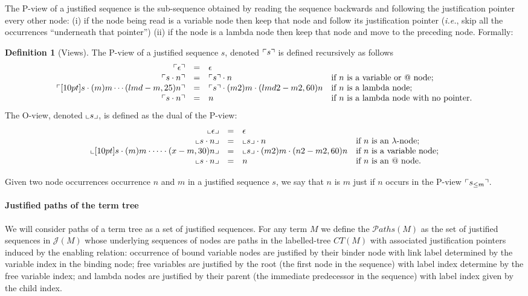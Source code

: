 \documentclass{article}
\makeatletter
\theoremstyle{plain}
\theoremstyle{definition}
\newtheorem{definition}{Definition}[section]
\theoremstyle{remark}
\newcommand{\ctree}{CT} %
\newcommand\pathset{{\mathcal{P}aths}} %
\renewcommand\ie{{\it i.e.\@\xspace}}
\def\justseqset{\mathcal{J}}
\makeatother
\begin{document}
The P-view of a justified sequence is the sub-sequence obtained by reading the sequence backwards
and following the justification pointer every other node: (i) if the node being read is a variable node then keep that node and follow its justification pointer (\ie, skip all the occurrences ``underneath that pointer'') (ii) if the node is a lambda node then keep that node and move to the preceding node. Formally:
\begin{definition}[Views]
\label{def:views}
The P-view of a justified sequence $s$, denoted $\ulcorner s \urcorner$ is defined recursively  as follows
$$\begin{array}{rcll}
 \pview{\epsilon} &=&  \epsilon \\
 \pview{s \cdot n }  &=&  \pview{s} \cdot n
    & \mbox{if $n$ is a variable or $@$ node;}
    \\
 \pview{\Pstr[10pt]{ s \cdot (m){m} \cdots (lmd-m,25){n}}} &=&
        \Pstr{ \pview{s} \cdot (m2){m} \cdot (lmd2-m2,60){n} }
    & \mbox{if $n$ is a lambda node;}
    \\
 \pview{s \cdot n }  &=&  n & \mbox{if $n$ is a lambda node with no pointer.}
\end{array}$$
The O-view, denoted $\llcorner s \lrcorner$, is defined as the dual of the P-view:
$$\begin{array}{rcll}
 \oview{\epsilon} &=&  \epsilon \\
 \oview{s \cdot n }  &=&  \oview{s} \cdot n
    & \mbox{if $n$ is an $\lambda$-node;}
    \\
 \oview{\Pstr[10pt]{s \cdot (m){m} \cdot \cdots \cdot (x-m,30){n}}} &=&
    \Pstr{ \oview{s} \cdot (m2){m} \cdot (n2-m2,60){n} }
    & \mbox{if $n$ is a variable node;}
    \\
 \oview{s \cdot n }  &=&  n
    & \mbox{if $n$ is an $@$ node.}
\end{array}$$
\end{definition}

Given two node occurrences occurrence $n$ and $m$ in a justified sequence $s$, we say that $n$ is  $m$ just if $n$ occurs in the P-view $\ulcorner s_{\leq m} \urcorner$.

\paragraph{Justified paths of the term tree}

We will consider paths of a term tree as a set of justified sequences. For any term $M$ we define the  $\pathset(M)$ as the set of justified sequences in $\justseqset(M)$ whose underlying sequences of nodes are paths in the labelled-tree $\ctree(M)$ with associated justification pointers induced by the enabling relation: occurrence of bound variable nodes are justified by their binder node with link label determined by the variable index in the binding node; free variables are justified by the root (the first node in the sequence) with label index determine by the free variable index; and lambda nodes are justified by their parent (the immediate predecessor in the sequence) with label index given by the child index.
\end{document}
